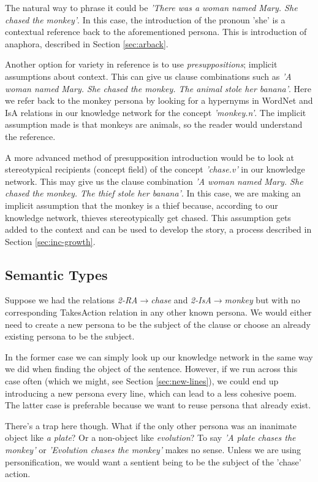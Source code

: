 The natural way to phrase it could be \textit{'There was a woman named Mary. She chased the monkey'}. In this case, the introduction of the pronoun 'she' is a contextual reference back to the aforementioned persona. This is introduction of anaphora, described in Section \ref{sec:arback}.

Another option for variety in reference is to use \textit{presuppositions}; implicit assumptions about context. This can give us clause combinations such as \textit{'A woman named Mary. She chased the monkey. The animal stole her banana'}. Here we refer back to the monkey persona by looking for a hypernyms in WordNet and IsA relations in our knowledge network for the concept \textit{'monkey.n'}. The implicit assumption made is that monkeys are animals, so the reader would understand the reference.

A more advanced method of presupposition introduction would be to look at stereotypical recipients (concept field) of the concept \textit{'chase.v'} in our knowledge network. This may give us the clause combination \textit{'A woman named Mary. She chased the monkey. The thief stole her banana'}. In this case, we are making an implicit assumption that the monkey is a thief because, according to our knowledge network, thieves stereotypically get chased. This assumption gets added to the context and can be used to develop the story, a process described in Section \ref{sec:inc-growth}.

\subsection{Semantic Types}
\label{sec:sem-type} 
Suppose we had the relations \textit{2-RA$\rightarrow$chase} and \textit{2-IsA$\rightarrow$monkey} but with no corresponding TakesAction relation in any other known persona. We would either need to create a new persona to be the subject of the clause or choose an already existing persona to be the subject.

In the former case we can simply look up our knowledge network in the same way we did when finding the object of the sentence. However, if we run across this case often (which we might, see Section \ref{sec:new-lines}), we could end up introducing a new persona every line, which can lead to a less cohesive poem. The latter case is preferable because we want to reuse persona that already exist.

There's a trap here though. What if the only other persona was an inanimate object like \textit{a plate}? Or a non-object like \textit{evolution}? To say \textit{'A plate chases the monkey'} or \textit{'Evolution chases the monkey'} makes no sense. Unless we are using personification, we would want a sentient being to be the subject of the 'chase' action.

